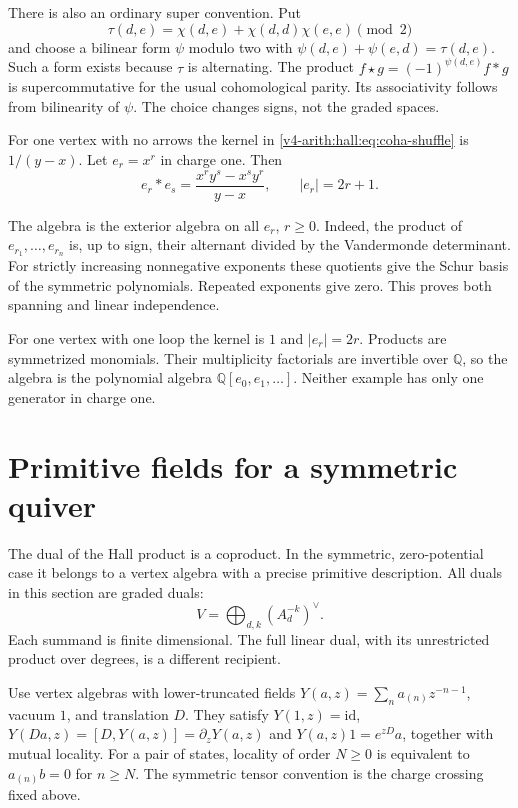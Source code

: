 There is also an ordinary super convention. Put
\[
 \tau(d,e)=\chi(d,e)+\chi(d,d)\chi(e,e)\pmod2
\]
and choose a bilinear form $\psi$ modulo two with
$\psi(d,e)+\psi(e,d)=\tau(d,e)$.
Such a form exists because $\tau$ is alternating.
The product $f\star g=(-1)^{\psi(d,e)}f*g$ is supercommutative
for the usual cohomological parity. Its associativity follows from
bilinearity of $\psi$. The choice changes signs, not the graded spaces.

\begin{example}\label{v4-arith:hall:ex:zero-one-loop}
For one vertex with no arrows the kernel in
\eqref{v4-arith:hall:eq:coha-shuffle} is $1/(y-x)$.
Let $e_r=x^r$ in charge one. Then
\[
 e_r*e_s=\frac{x^r y^s-x^s y^r}{y-x},\qquad |e_r|=2r+1.
\]

The algebra is the exterior algebra on all $e_r$, $r\geq0$.
Indeed, the product of $e_{r_1},\ldots,e_{r_n}$ is, up to sign,
their alternant divided by the Vandermonde determinant.
For strictly increasing nonnegative exponents these quotients give
the Schur basis of the symmetric polynomials. Repeated exponents
give zero. This proves both spanning and linear independence.

For one vertex with one loop the kernel is $1$ and $|e_r|=2r$.
Products are symmetrized monomials. Their multiplicity factorials
are invertible over $\mathbb Q$, so the algebra is the polynomial
algebra $\mathbb Q[e_0,e_1,\ldots]$.
Neither example has only one generator in charge one.
\end{example}

\section{Primitive fields for a symmetric quiver}
\label{v4-arith:hall:sec:vertex-envelope}

The dual of the Hall product is a coproduct. In the symmetric,
zero-potential case it belongs to a vertex algebra with a precise
primitive description. All duals in this section are graded duals:
\[
 V=\bigoplus_{d,k}(A_d^{-k})^\vee.
\]
Each summand is finite dimensional. The full linear dual, with its
unrestricted product over degrees, is a different recipient.

Use vertex algebras with lower-truncated fields
$Y(a,z)=\sum_n a_{(n)}z^{-n-1}$, vacuum $1$, and translation $D$.
They satisfy $Y(1,z)=\mathrm{id}$,
$Y(Da,z)=[D,Y(a,z)]=\partial_zY(a,z)$ and
$Y(a,z)1=e^{zD}a$, together with mutual locality.
For a pair of states, locality of order $N\geq0$ is equivalent
to $a_{(n)}b=0$ for $n\geq N$.
The symmetric tensor convention is the charge crossing fixed above.

